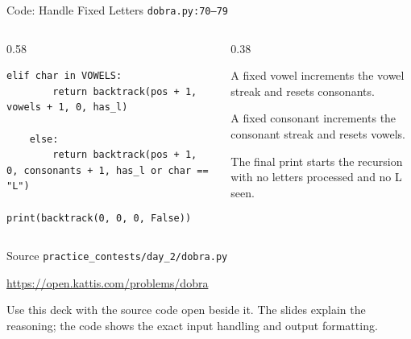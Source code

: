 \documentclass[aspectratio=169,11pt]{beamer}
\begin{document}
\begin{frame}[fragile]{Code: Handle Fixed Letters}
\scriptsize
{} \texttt{dobra.py:70--79}

\vspace{0.08cm}
\begin{columns}[T,totalwidth=\textwidth]
\begin{column}{0.58\textwidth}
\begin{lstlisting}[style=cpcode]
    elif char in VOWELS:
        return backtrack(pos + 1, vowels + 1, 0, has_l)

    else:
        return backtrack(pos + 1, 0, consonants + 1, has_l or char == "L")

print(backtrack(0, 0, 0, False))
\end{lstlisting}
\end{column}
\begin{column}{0.38\textwidth}
\begin{tightitemize}
  \item A fixed vowel increments the vowel streak and resets consonants.
  \item A fixed consonant increments the consonant streak and resets vowels.
  \item The final print starts the recursion with no letters processed and no L seen.
\end{tightitemize}
\end{column}
\end{columns}
\end{frame}

\begin{frame}{Source}
\small
{} \texttt{practice\_contests/day\_2/dobra.py}

\vspace{0.3cm}
 \url{https://open.kattis.com/problems/dobra}

\vspace{0.45cm}
Use this deck with the source code open beside it. The slides explain the reasoning; the code shows the exact input handling and output formatting.
\end{frame}
\end{document}
